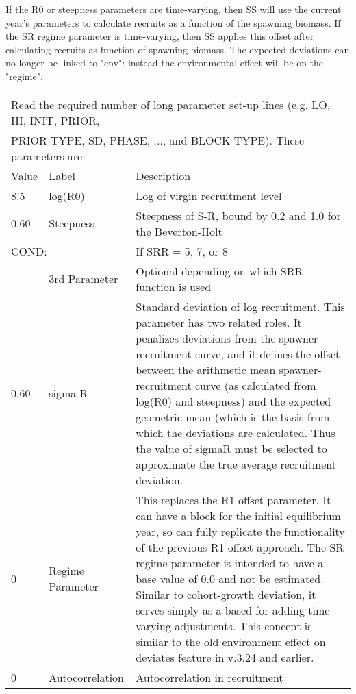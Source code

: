If the R0 or steepness parameters are time-varying, then SS will use the current year's parameters to calculate recruits as a function of the spawning biomass.  If the SR regime parameter is time-varying, then SS applies this offset after calculating recruits as function of spawning biomass.  The expected deviations can no longer be linked to "env": instead the environmental effect will be on the "regime".   
\begin{center}
	\begin{longtable}{p{1cm} p{3cm} p{11cm}}
	      
		\multicolumn{3}{l}{Read the required number of long parameter set-up lines (e.g. LO, HI, INIT, PRIOR, }\\
		\multicolumn{3}{l}{PRIOR TYPE, SD, PHASE, ..., and BLOCK TYPE).  These parameters are:}\\
		\hline
		Value & Label &  Description\\
		\hline
		8.5 & log(R0) & Log of virgin recruitment level \\
		\hline
		0.60 & Steepness  & Steepness of S-R, bound by 0.2 and 1.0 for the Beverton-Holt \\
		\hline
		\multicolumn{2}{l}{COND:} & If SRR = 5, 7, or 8\\
		& 3rd Parameter & Optional depending on which SRR function is used \\
		\hline
		0.60 & sigma-R &  Standard deviation of log recruitment.
		This parameter has two related roles.  It penalizes deviations from the spawner-recruitment curve, and it defines the offset between the arithmetic mean spawner-recruitment curve (as calculated from log(R0) and steepness) and the expected geometric mean (which is the basis from which the deviations are calculated.  Thus the value of sigmaR must be selected to approximate the true average recruitment deviation.\\
		\hline
		0 & Regime Parameter & This replaces the R1 offset parameter.  It can have a block for the initial equilibrium year, so can fully replicate the functionality of the previous R1 offset approach.  The SR regime parameter is intended to have a base value of 0.0 and not be estimated.  Similar to cohort-growth deviation, it serves simply as a based for adding time-varying adjustments.  This concept is similar to the old environment effect on deviates feature in v.3.24 and earlier.\\
		\hline
		0 & Autocorrelation & Autocorrelation in recruitment \\
		\hline
	\end{longtable}
\end{center}

